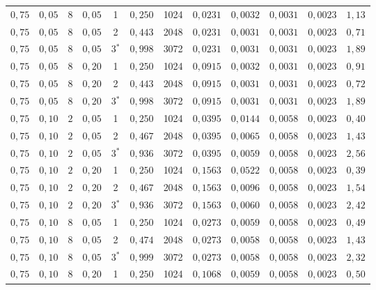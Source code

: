 \begin{tabular}{cccccccccccc}
$0{,}75$ & $0{,}05$ & $8$ & $0{,}05$ & 1 & $0{,}250$ & 1024 & $0{,}0231$ & $0{,}0032$ & $0{,}0031$ & $0{,}0023$ & $1{,}13$ \\
$0{,}75$ & $0{,}05$ & $8$ & $0{,}05$ & 2 & $0{,}443$ & 2048 & $0{,}0231$ & $0{,}0031$ & $0{,}0031$ & $0{,}0023$ & $0{,}71$ \\
$0{,}75$ & $0{,}05$ & $8$ & $0{,}05$ & 3$^*$ & $0{,}998$ & 3072 & $0{,}0231$ & $0{,}0031$ & $0{,}0031$ & $0{,}0023$ & $1{,}89$ \\
$0{,}75$ & $0{,}05$ & $8$ & $0{,}20$ & 1 & $0{,}250$ & 1024 & $0{,}0915$ & $0{,}0032$ & $0{,}0031$ & $0{,}0023$ & $0{,}91$ \\
$0{,}75$ & $0{,}05$ & $8$ & $0{,}20$ & 2 & $0{,}443$ & 2048 & $0{,}0915$ & $0{,}0031$ & $0{,}0031$ & $0{,}0023$ & $0{,}72$ \\
$0{,}75$ & $0{,}05$ & $8$ & $0{,}20$ & 3$^*$ & $0{,}998$ & 3072 & $0{,}0915$ & $0{,}0031$ & $0{,}0031$ & $0{,}0023$ & $1{,}89$ \\
\midrule
$0{,}75$ & $0{,}10$ & $2$ & $0{,}05$ & 1 & $0{,}250$ & 1024 & $0{,}0395$ & $0{,}0144$ & $0{,}0058$ & $0{,}0023$ & $0{,}40$ \\
$0{,}75$ & $0{,}10$ & $2$ & $0{,}05$ & 2 & $0{,}467$ & 2048 & $0{,}0395$ & $0{,}0065$ & $0{,}0058$ & $0{,}0023$ & $1{,}43$ \\
$0{,}75$ & $0{,}10$ & $2$ & $0{,}05$ & 3$^*$ & $0{,}936$ & 3072 & $0{,}0395$ & $0{,}0059$ & $0{,}0058$ & $0{,}0023$ & $2{,}56$ \\
$0{,}75$ & $0{,}10$ & $2$ & $0{,}20$ & 1 & $0{,}250$ & 1024 & $0{,}1563$ & $0{,}0522$ & $0{,}0058$ & $0{,}0023$ & $0{,}39$ \\
$0{,}75$ & $0{,}10$ & $2$ & $0{,}20$ & 2 & $0{,}467$ & 2048 & $0{,}1563$ & $0{,}0096$ & $0{,}0058$ & $0{,}0023$ & $1{,}54$ \\
$0{,}75$ & $0{,}10$ & $2$ & $0{,}20$ & 3$^*$ & $0{,}936$ & 3072 & $0{,}1563$ & $0{,}0060$ & $0{,}0058$ & $0{,}0023$ & $2{,}42$ \\
$0{,}75$ & $0{,}10$ & $8$ & $0{,}05$ & 1 & $0{,}250$ & 1024 & $0{,}0273$ & $0{,}0059$ & $0{,}0058$ & $0{,}0023$ & $0{,}49$ \\
$0{,}75$ & $0{,}10$ & $8$ & $0{,}05$ & 2 & $0{,}474$ & 2048 & $0{,}0273$ & $0{,}0058$ & $0{,}0058$ & $0{,}0023$ & $1{,}43$ \\
$0{,}75$ & $0{,}10$ & $8$ & $0{,}05$ & 3$^*$ & $0{,}999$ & 3072 & $0{,}0273$ & $0{,}0058$ & $0{,}0058$ & $0{,}0023$ & $2{,}32$ \\
$0{,}75$ & $0{,}10$ & $8$ & $0{,}20$ & 1 & $0{,}250$ & 1024 & $0{,}1068$ & $0{,}0059$ & $0{,}0058$ & $0{,}0023$ & $0{,}50$ \\

\end{tabular}
